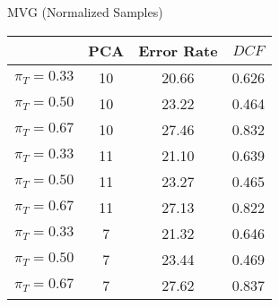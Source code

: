 \caption{MVG (Normalized Samples)}\label{tab:mvgn_acctable}
\begin{center}
\begin{tabular}{|c|c||c|c|}
\hline
\ & PCA & Error Rate & $DCF$\\
\hline
$\pi_T = 0.33$ & 10 & 20.66 & 0.626 \\
$\pi_T = 0.50$ & 10 & 23.22 & 0.464 \\
$\pi_T = 0.67$ & 10 & 27.46 & 0.832 \\
\hline
$\pi_T = 0.33$ & 11 & 21.10 & 0.639 \\
$\pi_T = 0.50$ & 11 & 23.27 & 0.465 \\
$\pi_T = 0.67$ & 11 & 27.13 & 0.822 \\
\hline
$\pi_T = 0.33$ & 7 & 21.32 & 0.646 \\
$\pi_T = 0.50$ & 7 & 23.44 & 0.469 \\
$\pi_T = 0.67$ & 7 & 27.62 & 0.837 \\
\hline
\end{tabular}
\end{center}
